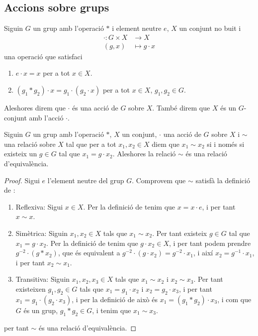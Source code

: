 \documentclass[../Apunts.tex]{subfiles}
\begin{document}
	\subsection{Accions sobre grups}
	\begin{definition}
		\label{def:acció d'un grup sobre un conjunt}
		Siguin \(G\) un grup amb l'operació \(\ast\) i element neutre \(e\), \(X\) un conjunt no buit i
		\begin{align*}
		\cdot\colon G\times X&\longrightarrow X\\
		(g,x)&\longmapsto g\cdot x
		\end{align*}
		una operació que satisfaci
		\begin{enumerate}
			\item \(e\cdot x=x\) per a tot \(x\in X\).
			\item \((g_{1}\ast g_{2})\cdot x=g_{1}\cdot(g_{2}\cdot x)\) per a tot \(x\in X\), \(g_{1},g_{2}\in G\).
		\end{enumerate}
		Aleshores direm que \(\cdot\) és una acció de \(G\) sobre \(X\). També direm que \(X\) és un \(G\)-conjunt amb l'acció \(\cdot\).
	\end{definition}
	\begin{proposition}
		\label{prop:relacio d'òrbites és d'equivalència}
		Siguin \(G\) un grup amb l'operació \(\ast\), \(X\) un conjunt, \(\cdot\) una acció de \(G\) sobre \(X\) i \(\sim\) una relació sobre \(X\) tal que per a tot \(x_{1},x_{2}\in X\) diem que \(x_{1}\sim x_{2}\) si i només si existeix un \(g\in G\) tal que \(x_{1}=g\cdot x_{2}\). Aleshores la relació \(\sim\) és una relació d'equivalència.
		\begin{proof}
			Sigui \(e\) l'element neutre del grup \(G\). Comprovem que \(\sim\) satisfà la definició de :
			\begin{enumerate}
				\item Reflexiva: Sigui \(x\in X\). Per la definició de  tenim que \(x=x\cdot e\), i per tant \(x\sim x\).
				\item Simètrica: Siguin \(x_{1},x_{2}\in X\) tals que \(x_{1}\sim x_{2}\). Per tant existeix \(g\in G\) tal que \(x_{1}=g\cdot x_{2}\). Per la definició de  tenim que \(g\cdot x_{2}\in X\), i per tant podem prendre \(g^{-2}\cdot(g\ast x_{2})\), que és equivalent a \(g^{-2}\cdot(g\cdot x_{2})=g^{-2}\cdot x_{1}\), i així \(x_{2}=g^{-1}\cdot x_{1}\), i per tant \(x_{2}\sim x_{1}\).
				\item Transitiva: Siguin \(x_{1},x_{2},x_{3}\in X\) tals que \(x_{1}\sim x_{2}\) i \(x_{2}\sim x_{3}\). Per tant existeixen \(g_{1},g_{2}\in G\) tals que \(x_{1}=g_{1}\cdot x_{2}\) i \(x_{2}=g_{2}\cdot x_{3}\), i per tant \(x_{1}=g_{1}\cdot(g_{2}\cdot x_{3})\), i per la definició de  això és \(x_{1}=(g_{1}\ast g_{2})\cdot x_{3}\), i com que \(G\) és un grup, \(g_{1}\ast g_{2}\in G\), i tenim que \(x_{1}\sim x_{3}\).
			\end{enumerate}
			per tant \(\sim\) és una relació d'equivalència.
		\end{proof}
	\end{proposition}
\end{document}

